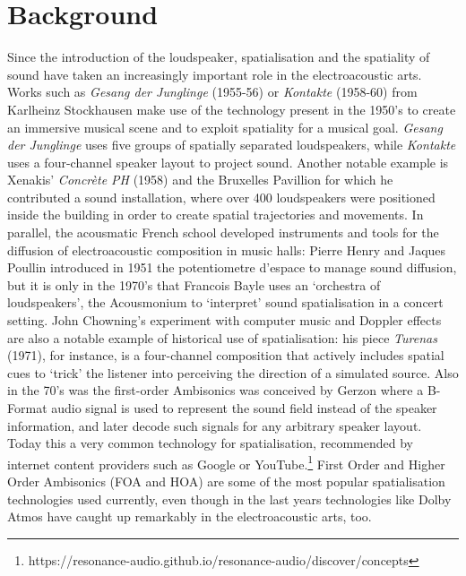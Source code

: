 \documentclass{article}
\begin{document}
        \section{Background}
	\label{sec:background}

Since the introduction of the loudspeaker, spatialisation and the spatiality of sound have taken an increasingly important role in the electroacoustic arts. Works such as \textit{Gesang der Junglinge} (1955-56) or \textit{Kontakte} (1958-60) from Karlheinz Stockhausen make use of the technology present in the 1950’s to create an immersive musical scene and to exploit spatiality for a musical goal. \textit{Gesang der Junglinge} uses five groups of spatially separated loudspeakers\cite{Decroupet1998}, while \textit{Kontakte} uses a four-channel speaker layout to project sound. Another notable example is Xenakis’ \textit{Concrète PH} (1958) and the Bruxelles Pavillion for which he contributed a sound installation, where over 400 loudspeakers were positioned inside the building in order to create spatial trajectories and movements\cite{Lombardo2005}. In parallel, the acousmatic French school developed instruments and tools for the diffusion of electroacoustic composition in music halls: Pierre Henry and Jaques Poullin introduced in 1951 the potentiometre d’espace to manage sound diffusion, but it is only in the 1970’s that Francois Bayle uses an ‘orchestra of loudspeakers’, the Acousmonium to ‘interpret’ sound spatialisation in a concert setting\cite{Solomon2007}. John Chowning’s experiment with computer music and Doppler effects are also a notable example of historical use of spatialisation: his piece \textit{Turenas} (1971), for instance, is a four-channel composition that actively includes spatial cues to ‘trick’ the listener into perceiving the direction of a simulated source\cite{Chowning1977}. Also in the 70’s was the first-order Ambisonics was conceived by Gerzon where a B-Format audio signal is used to represent the sound field instead of the speaker information, and later decode such signals for any arbitrary speaker layout\cite{Zotter2019}. Today this a very common technology for spatialisation, recommended by internet content providers such as Google or YouTube.\footnote{https://resonance-audio.github.io/resonance-audio/discover/concepts} First Order and Higher Order Ambisonics (FOA and HOA) are some of the most popular spatialisation technologies used currently\cite{Peters2011}, even though in the last years technologies like Dolby Atmos have caught up remarkably in the electroacoustic arts, too. 
\end{document}

